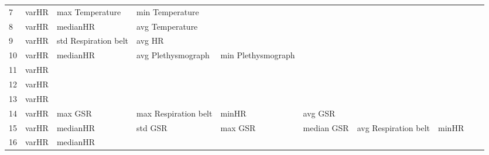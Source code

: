 \begin{landscape}
\begin{table}[]
\begin{tabular}{l|llllllll}
7        & varHR                   & max Temperature       & min Temperature         &                         &                         &                       &                      &          &                      &        \\
8        & varHR                   & medianHR              & avg Temperature         &                         &                         &                       &                      &          &                      &        \\
9        & varHR                   & std Respiration belt  & avg HR                  &                         &                         &                       &                      &          &                      &        \\
10       & varHR                   & medianHR              & avg Plethysmograph      & min Plethysmograph      &                         &                       &                      &          &                      &        \\
11       & varHR                   &                       &                         &                         &                         &                       &                      &          &                      &        \\
12       & varHR                   &                       &                         &                         &                         &                       &                      &          &                      &        \\
13       & varHR                   &                       &                         &                         &                         &                       &                      &          &                      &        \\
14       & varHR                   & max GSR               & max Respiration belt    & minHR                   & avg GSR                 &                       &                      &          &                      &        \\
15       & varHR                   & medianHR              & std GSR                 & max GSR                 & median GSR              & avg Respiration belt  & minHR                &          &                      &        \\
16       & varHR                   & medianHR              &                         &                         &                         &                       &                      &          &                      &        \\

\end{tabular}
\end{table}
\end{landscape}
